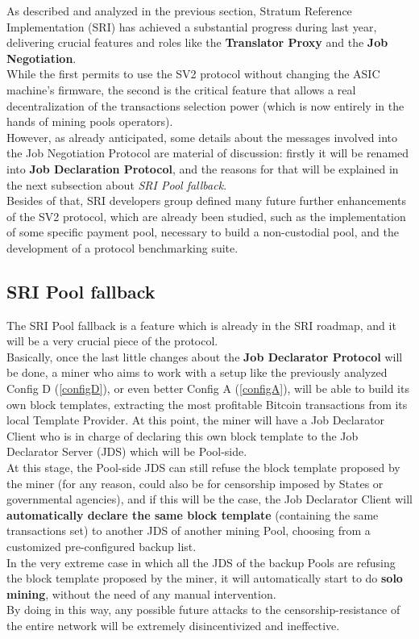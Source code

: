 As described and analyzed in the previous section, Stratum Reference Implementation (SRI) has achieved a substantial progress during last year, delivering crucial features and roles like the \textbf{Translator Proxy} and the \textbf{Job Negotiation}. \\ While the first permits to use the SV2 protocol without changing the ASIC machine's firmware, the second is the critical feature that allows a real decentralization of the transactions selection power (which is now entirely in the hands of mining pools operators).\\
However, as already anticipated, some details about the messages involved into the Job Negotiation Protocol are material of discussion: firstly it will be renamed into \textbf{Job Declaration Protocol}, and the reasons for that will be explained in the next subsection about \textit{SRI Pool fallback}.\\
Besides of that, SRI developers group defined many future further enhancements of the SV2 protocol, which are already been studied, such as the implementation of some specific payment pool, necessary to build a non-custodial pool, and the development of a protocol benchmarking suite.
\subsection{SRI Pool fallback}
The SRI Pool fallback is a feature which is already in the SRI roadmap, and it will be a very crucial piece of the protocol.\\
Basically, once the last little changes about the \textbf{Job Declarator Protocol} will be done, a miner who aims to work with a setup like the previously analyzed Config D (\ref{configD}), or even better Config A (\ref{configA}), will be able to build its own block templates, extracting the most profitable Bitcoin transactions from its local Template Provider. At this point, the miner will have a Job Declarator Client who is in charge of declaring this own block template to the Job Declarator Server (JDS) which will be Pool-side.\\
At this stage, the Pool-side JDS can still refuse the block template proposed by the miner (for any reason, could also be for censorship imposed by States or governmental agencies), and if this will be the case, the Job Declarator Client will \textbf{automatically declare the same block template} (containing the same transactions set) to another JDS of another mining Pool, choosing from a customized pre-configured backup list.\\
In the very extreme case in which all the JDS of the backup Pools are refusing the block template proposed by the miner, it will automatically start to do \textbf{solo mining}, without the need of any manual intervention.\\
By doing in this way, any possible future attacks to the censorship-resistance of the entire network will be extremely disincentivized and ineffective.

